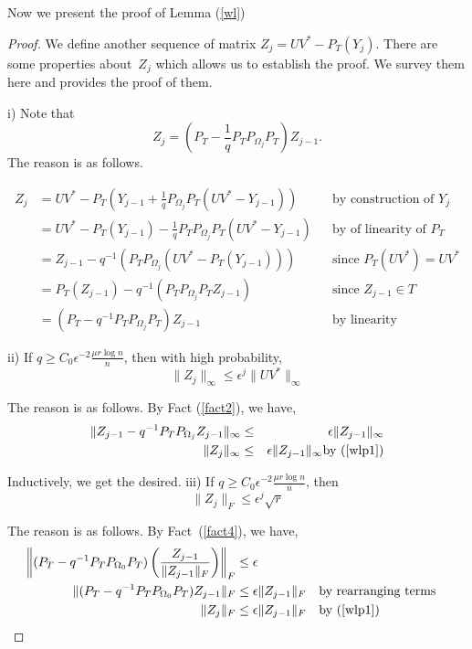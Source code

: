 Now we present the proof of Lemma (\ref{wl})

\begin{proof}
We define another sequence of matrix $Z_{j}=UV^{*}-P_{T}(Y_{j})$. There are some properties about~$Z_{j}$ which allows us to establish the proof. We survey them here and provides the proof of them.

i) Note that
\begin{equation}
Z_{j} = \left( P_{T}-\frac{1}{q}P_{T}P_{\Omega_{j}}P_{T} \right) Z_{j-1}. \label{wlp1}
\end{equation}
The reason is as follows.

\[
\begin{aligned}
Z_{j}
 & = UV^{*} - P_{T} \left( Y_{j-1} + \frac{1}{q}P_{\Omega_{j}} P_{T}(UV^{*}-Y_{j-1}) \right)
 &&\text{by construction of } Y_j \\
 & = UV^{*} - P_{T} ( Y_{j-1}) - \frac{1}{q}P_{T} P_{\Omega_{j}} P_{T}( UV^{*} - Y_{j-1} )
 &&\text{by of linearity of } P_{T}\\
 & = Z_{j-1} - q^{-1}(P_{T}P_{\Omega_{j}}(UV^{*}-P_{T}(Y_{j-1})))
 &&\text{since } P_{T}(UV^{*}) = UV^{*}\\
 & = P_{T}(Z_{j-1}) - q^{-1}(P_{T}P_{\Omega_{j}}P_{T}Z_{j-1})
 &&\text{since } Z_{j-1}\in T\\
 & = ( P_{T} - q^{-1} P_{T} P_{\Omega_{j}} P_{T} ) Z_{j-1}
 &&\text{by linearity}
\end{aligned}
\]

ii) If $q\ge C_{0}\epsilon^{-2}\frac{\mu r\log n}{n}$, then  with high probability,
%
\begin{equation}
\| Z_{j}\|_{\infty}\le\epsilon^{j}\|UV^{*}\|_{\infty} \label{wlp2}
\end{equation}

The reason is as follows. By Fact (\ref{fact2}), we have,
%
\begin{eqnarray*}
\|Z_{j-1}-q^{-1}P_{T}P_{\Omega_{j}}Z_{j-1}\|_{\infty} & \le & \epsilon\|Z_{j-1}\|_{\infty} \\
\|Z_{j}\|_{\infty} & \le & \epsilon\|Z_{j-1}\|_{\infty} \text{by (\ref{wlp1})}
\end{eqnarray*}


Inductively, we get the desired.
%
iii) If $q\ge C_{0}\epsilon^{-2}\frac{\mu r\log n}{n}$, then
\begin{equation}
\|Z_{j}\|_{F}\le\epsilon^{j}\sqrt{r}  \label{wlp3}
\end{equation}

The reason is as follows. By Fact~(\ref{fact4}), we have,
%
\begin{align*}
\left\|(P_{T}-q^{-1}P_{T}P_{\Omega_{0}}P_{T}) \left( \frac{Z_{j-1}}{\|Z_{j-1}\|_{F}} \right) \right\|_{F} & \le \epsilon\\
\|(P_{T}-q^{-1}P_{T}P_{\Omega_{0}}P_{T})Z_{j-1}\|_{F} & \le \epsilon\|Z_{j-1}\|_{F} && \text{by rearranging terms}\\
\|Z_{j}\|_{F} & \le \epsilon\|Z_{j-1}\|_{F} &&\text{by (\ref{wlp1}) }
\end{align*}


\end{proof}
